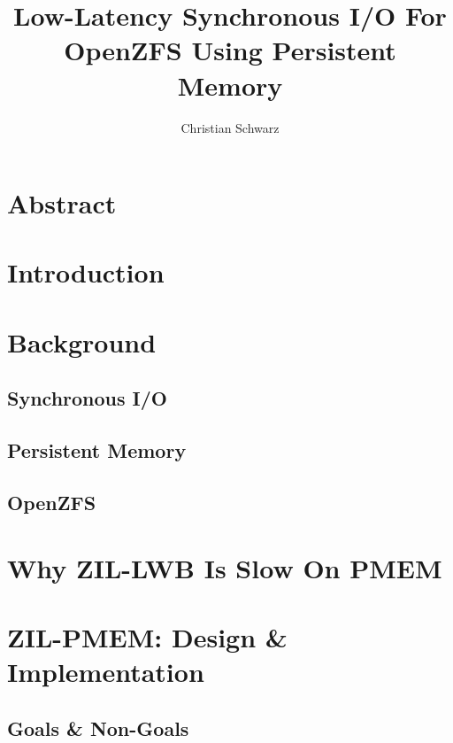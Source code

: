 \documentclass[12pt,a4paper,twoside,draft]{book}
\begin{document}
\frontmatter
{}

\title{Low-Latency Synchronous I/O For OpenZFS Using Persistent Memory}
\author{Christian Schwarz}
\maketitle



\chapter{Abstract}

\mainmatter
\cleardoublepage
{}
{}
\tableofcontents

\chapter{Introduction}

\chapter{Background}
\section{Synchronous I/O}
\section{Persistent Memory}
\section{OpenZFS}

\chapter{Why ZIL-LWB Is Slow On PMEM}

\chapter{ZIL-PMEM: Design \& Implementation}

\section{Goals \& Non-Goals}
\end{document}
